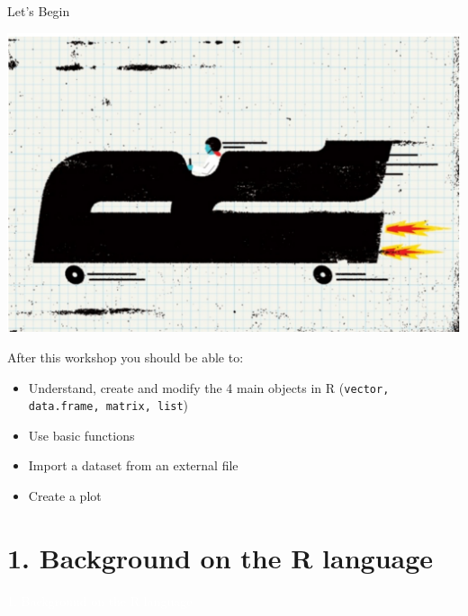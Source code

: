 \documentclass[11pt]{beamer}\usepackage[]{graphicx}\usepackage[]{color}
\newcommand{\code}[1]{\texttt{#1}}
\begin{document}
\begin{frame}[plain]{Let's Begin}
\hspace*{-1.5cm}\parbox[t]{\textwidth}{
\begin{center}
\includegraphics[scale=0.71]{introR.png}
\end{center}
}
\end{frame}


\begin{frame}[plain]
\hspace*{-1.0cm}\parbox[t]{\textwidth}{
\begin{block}{After this workshop you should be able to:}
\begin{itemize}
\item Understand, create and modify the 4 main objects in R (\code{vector, data.frame, matrix, list}) 
\item Use basic functions
\item Import a dataset from an external file
\item Create a plot
\end{itemize}
\end{block}
}
\end{frame}


\section{1. Background on the R language}

\begin{frame}[plain]
\hspace*{-1.0cm}\parbox[t]{\textwidth}{
 \begin{center}
  \Huge{\textcolor{white}{1. Background on the R language}}
 \end{center}
 }
\end{frame}
\end{document}
